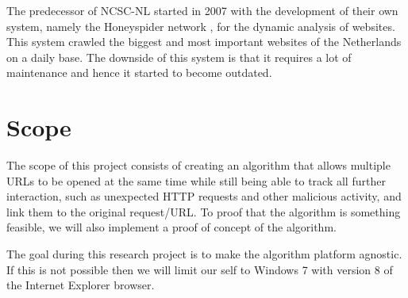 \documentclass{scrartcl}
\begin{document}
The predecessor of NCSC-NL started in 2007 with the development of their own system, namely the Honeyspider network \cite{honeyspider}, for the dynamic analysis of websites. This system crawled the biggest and most important websites of the Netherlands on a daily base. The downside of this system is that it requires a lot of maintenance and hence it started to become outdated.





\section{Scope}

The scope of this project consists of creating an algorithm that allows multiple URLs to be opened at the same time while still being able to track all further interaction, such as unexpected HTTP requests and other malicious activity, and link them to the original request/URL. To proof that the algorithm is something feasible, we will also implement a proof of concept of the algorithm.

The goal during this research project is to make the algorithm platform agnostic. If this is not possible then we will limit our self to Windows 7 with version 8 of the Internet Explorer browser.
\end{document}
